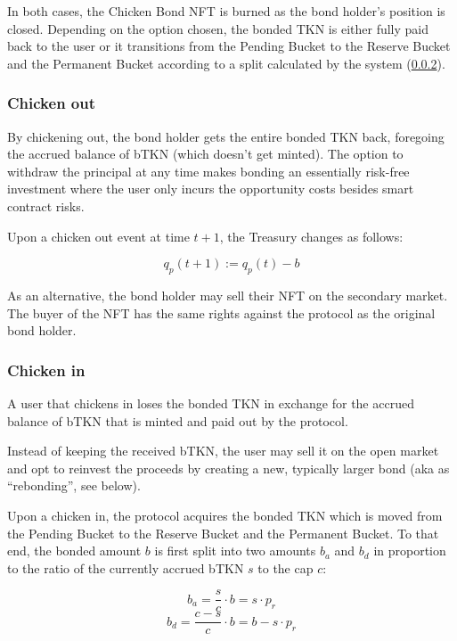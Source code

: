 \documentclass{article}
\begin{document}
In both cases, the Chicken Bond NFT is burned as the bond holder’s position is closed. Depending on the option chosen, the bonded TKN is either fully paid back to the user or it transitions from the Pending Bucket to the Reserve Bucket and the Permanent Bucket according to a split calculated by the system (\ref{sec:chicken-in}). 

\subsubsection{Chicken out}
\label{sec:chicken-out}
By chickening out, the bond holder gets the entire bonded TKN back, foregoing the accrued balance of bTKN (which doesn’t get minted). The option to withdraw the principal at any time makes bonding an essentially risk-free investment where the user only incurs the opportunity costs besides smart contract risks.

Upon a chicken out event at time $t+1$, the Treasury changes as follows:

\begin{equation}
  \label{eq:chicken-out-transition}
    q_p(t+1) := q_p(t) - b
\end{equation}

As an alternative, the bond holder may sell their NFT on the secondary market. The buyer of the NFT has the same rights against the protocol as the original bond holder.

\subsubsection{Chicken in}
\label{sec:chicken-in}
A user that chickens in loses the bonded TKN in exchange for the accrued balance of bTKN that is minted and paid out by the protocol. 

Instead of keeping the received bTKN, the user may sell it on the open market and opt to reinvest the proceeds by creating a new, typically larger bond (aka as “rebonding”, see below).

Upon a chicken in, the protocol acquires the bonded TKN which is moved from the Pending Bucket to the Reserve Bucket and the Permanent Bucket. To that end, the bonded amount $b$ is first split into two amounts $b_a$ and $b_d$ in proportion to the ratio of the currently accrued bTKN $s$ to the cap $c$:

\begin{equation}
  \label{eq:chicken-in-ba}
    b_a = \frac{s}{c} \cdot b = s \cdot p_r
\end{equation}
\begin{equation}
  \label{eq:chicken-in-bd}
    b_d = \frac{c-s}{c} \cdot b = b - s \cdot p_r
\end{equation}
\end{document}
